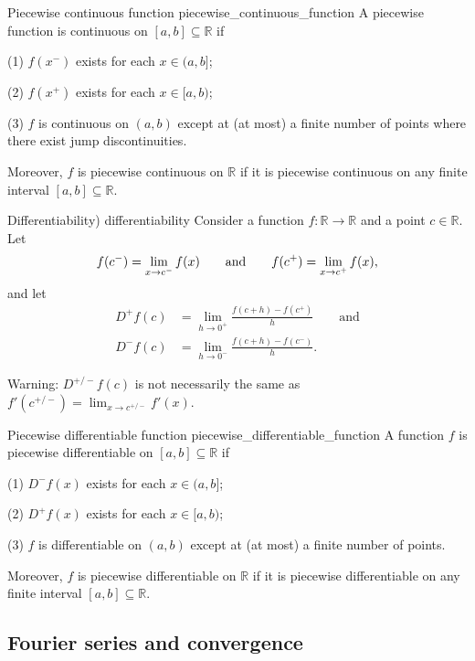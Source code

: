 \begin{definition}{Piecewise continuous function \cite{math2111_notes}}{piecewise_continuous_function}
A piecewise function is continuous on $[a, b] \subseteq \mathbb{R}$ if

(1) $f(x^-)$ exists for each $x \in (a, b]$;

(2) $f(x^+)$ exists for each $x \in [a, b)$;

(3) $f$ is continuous on $(a, b)$ except at (at most) a finite number of points where there exist jump discontinuities.

Moreover, $f$ is piecewise continuous on $\mathbb{R}$ if it is piecewise continuous on any finite interval $[a, b] \subseteq \mathbb{R}$.
\end{definition}

\begin{definition}{Differentiability) \cite{math2111_notes}}{differentiability}
Consider a function $ f : \mathbb{R} \to \mathbb{R} $ and a point $c \in \mathbb{R}$. Let
$$ f(c^-) = \lim_{x \to c^-} f(x) \qquad \textnormal{and} \qquad f(c^+) = \lim_{x \to c^+} f(x) , $$
and let
\begin{align*}
	D^+ f(c) &= \lim_{h \to 0^+} \frac{f(c + h) - f(c^+)}{h} \qquad \text{and} \\
	D^- f(c) &= \lim_{h \to 0^-} \frac{f(c + h) - f(c^-)}{h} .
\end{align*}

Warning: $D^{+/-} f(c)$ is not necessarily the same as $f'(c^{+/-}) = \lim_{x \to c^{+/-}} f'(x)$.
\end{definition}

\begin{definition}{Piecewise differentiable function \cite{math2111_notes}}{piecewise_differentiable_function}
A function $f$ is piecewise differentiable on $[a, b] \subseteq \mathbb{R}$ if

(1) $D^- f(x)$ exists for each $x \in (a, b]$;

(2) $D^+ f(x)$ exists for each $x \in [a, b)$;

(3) $f$ is differentiable on $(a, b)$ except at (at most) a finite number of points.

Moreover, $f$ is piecewise differentiable on $\mathbb{R}$ if it is piecewise differentiable on any finite interval $[a, b] \subseteq \mathbb{R}$.
\end{definition}

\subsection{Fourier series and convergence}

